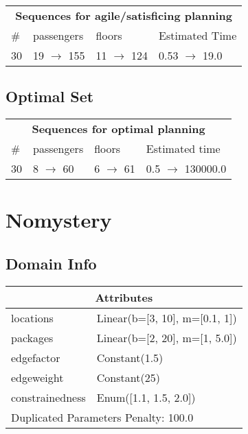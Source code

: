 \documentclass{article}
\begin{document}
                        \begin{center}
                        \begin{tabular}{l|l|l|l}
                        \multicolumn{4}{c}{\bf \large Sequences for agile/satisficing planning}\\
                        \# & passengers & floors & Estimated Time\\\midrule
                        30&19 $\rightarrow$ 155&11 $\rightarrow$ 124&0.53 $\rightarrow$ 19.0
                        \end{tabular}
                        \end{center}
                    
                            \subsection*{Optimal Set}

                            \begin{center}
                            \begin{tabular}{l|l|l|l}
                            \multicolumn{4}{c}{\bf \large Sequences for optimal planning}\\
                            \# & passengers & floors & Estimated time\\\midrule
                            30&8 $\rightarrow$ 60&6 $\rightarrow$ 61&0.5 $\rightarrow$ 130000.0
                            \end{tabular}
                            \end{center}
                    \newpage \section{Nomystery}
                    \subsection*{Domain Info}

                    \begin{center}
                    \begin{tabular}{p{}p{}}
                    \multicolumn{2}{c}{\bf \large Attributes}\\\midrule
                    locations & Linear(b=[3, 10], m=[0.1, 1])\\
packages & Linear(b=[2, 20], m=[1, 5.0])\\
edgefactor & Constant(1.5)\\
edgeweight & Constant(25)\\
constrainedness & Enum([1.1, 1.5, 2.0])
                    
                     \\\midrule
                    \multicolumn{2}{l}{Duplicated Parameters Penalty: 100.0}
                    \end{tabular}
                    \end{center}
                
\end{document}
